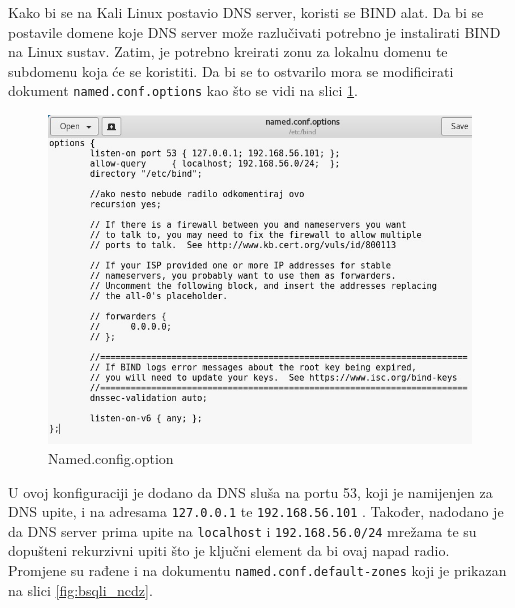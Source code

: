 \documentclass[12pt, oneside, onecolumn]{book}
\begin{document}
{Kako bi se na Kali Linux postavio DNS server, koristi se BIND alat. Da bi se postavile domene koje DNS server može razlučivati potrebno je instalirati BIND na Linux sustav. Zatim, je potrebno kreirati zonu za lokalnu domenu te subdomenu koja će se koristiti. Da bi se to ostvarilo mora se modificirati dokument \texttt{named.conf.options} kao što se vidi na slici \ref{fig:bsqli_nco}.

\begin{figure}[H]
	\begin{center}
		\includegraphics[width=\textwidth]{bsqli_nco.jpg}
		\caption{Named.config.option} \label{fig:bsqli_nco}
	\end{center}
\end{figure}

U ovoj konfiguraciji je dodano da DNS sluša na portu 53, koji je namijenjen za DNS upite, i na adresama \texttt{127.0.0.1} te \texttt{192.168.56.101} . Također, nadodano je da DNS server prima upite na \texttt{localhost} i \texttt{192.168.56.0/24} mrežama te su dopušteni rekurzivni upiti što je ključni element da bi ovaj napad radio. Promjene su rađene i na dokumentu \texttt{named.conf.default-zones} koji je prikazan na slici \ref{fig:bsqli_ncdz}.

}
\end{document}
